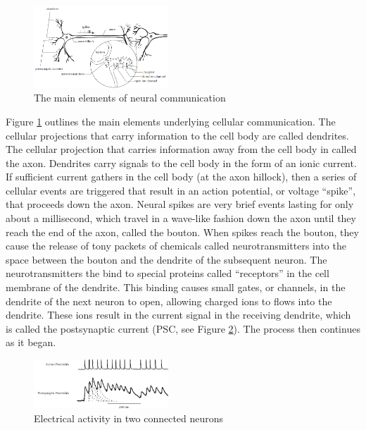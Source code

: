 \begin{figure}[h]
\centering
\includegraphics[width=0.45\textwidth]{imagenes/6-neuronal/transmision.png}
 \caption{The main elements of neural communication}
 \label{fig:cerebro}
\end{figure}
Figure \ref{fig:cerebro} outlines the main elements underlying cellular communication. The cellular projections that carry information to the cell body are called dendrites. The cellular projection that carries information away from the cell body in called the axon. Dendrites carry signals to the cell body in the form of an ionic current. If sufficient current gathers in the cell body (at the axon hillock), then a series of cellular events are triggered that result in an action potential, or voltage ``spike'', that proceeds down the axon. Neural spikes are very brief events lasting for only about a millisecond, which travel in a wave-like fashion down the axon until they reach the end of the axon, called the bouton. When spikes reach the bouton, they cause the release of tony packets of chemicals called neurotransmitters into the space between the bouton and the dendrite of the subsequent neuron. The neurotransmitters the bind to special proteins called ``receptors'' in the cell membrane of the dendrite. This binding causes small gates, or channels, in the dendrite of the next neuron to open, allowing charged ions to flows into the dendrite. These ions result in the current signal in the receiving dendrite, which is called the postsynaptic current (PSC, see Figure \ref{fig:spike}). The process then continues as it began.\\

\begin{figure}[h]
\centering
\includegraphics[width=0.45\textwidth]{imagenes/6-neuronal/spike.png}
 \caption{Electrical activity in two connected neurons}
 \label{fig:spike}
\end{figure}

